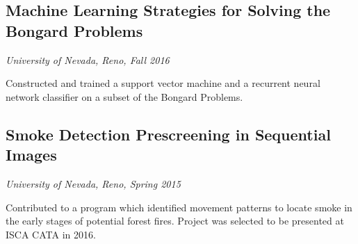 \documentclass[12pt]{article}
\begin{document}
\begin{flushleft}
\subsection*{Machine Learning Strategies for Solving the Bongard Problems}
\begin{adjustwidth}{1.5em}{0pt}
	\textit{University of Nevada, Reno, Fall 2016}
	\begin{adjustwidth}{1.5em}{0pt}
Constructed and trained a support vector machine and a recurrent neural network classifier on a subset of the Bongard Problems.
	\end{adjustwidth}
\end{adjustwidth}
\subsection*{Smoke Detection Prescreening in Sequential Images}
\begin{adjustwidth}{1.5em}{0pt}
	\textit{University of Nevada, Reno, Spring 2015}
	\begin{adjustwidth}{1.5em}{0pt}
Contributed to a program which identified movement patterns to locate smoke in the early stages of potential forest fires. Project was selected to be presented at ISCA CATA in 2016.  
	\end{adjustwidth}
\end{adjustwidth}
\end{flushleft}
\end{document}
